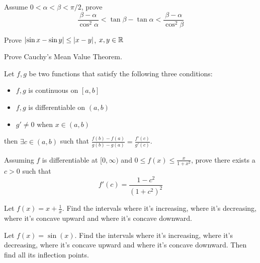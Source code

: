 \documentclass[Calculus 1 Recitation.tex]{subfiles}
\begin{document}
\begin{myleftlinebox}
	Assume $0<\alpha<\beta<\pi/2$, prove 
	\[\frac{\beta-\alpha}{\cos^2\alpha}<\tan\beta-\tan\alpha<\frac{\beta-\alpha}{\cos^2\beta}\]
	\tcblower
	\vspace{3em}	
\end{myleftlinebox}

\begin{myleftlinebox}
	Prove $\left\vert\sin x-\sin y\right\vert \leq \left\vert x-y\right\vert$, $x,y\in\mathbb{R}$
	\tcblower
	\vspace{3em}	
\end{myleftlinebox}

\begin{myleftlinebox}
	Prove Cauchy's Mean Value Theorem. 
	\begin{theorem}
		Let $f,g$ be two functions that satisfy the following three conditions:
		\begin{itemize}
			\item $f,g$ is continuous on $[a,b]$
			\item $f,g$ is differentiable on $(a,b)$
			\item $g'\neq0$ when $x\in(a,b)$
		\end{itemize}
		then $\exists c\in(a,b)$ such that $\frac{f(b)-f(a)}{g(b)-g(a)}=\frac{f'(c)}{g'(c)}$.
	\end{theorem}
	\tcblower
	\vspace{3em}	
\end{myleftlinebox}

\begin{myleftlinebox}
	Assuming $f$ is differentiable at $[0,\infty)$ and $0\leq f(x)\leq \frac{x}{1+x^2}$, prove there exists a $c>0$ such that
	\[f'(c)=\frac{1-c^2}{(1+c^2)^2}\]
	\tcblower
	\vspace{3em}
\end{myleftlinebox}

\begin{myleftlinebox}
	Let $f(x)=x+\frac{1}{x}$. Find the intervals where it's increasing, where it's decreasing, where it's concave upward and where it's concave downward.
	\tcblower
	\vspace{2em}
\end{myleftlinebox}

\begin{myleftlinebox}
	Let $f(x)=\sin(x)$. Find the intervals where it's increasing, where it's decreasing, where it's concave upward and where it's concave downward. Then find all its inflection points.
	\tcblower
	\vspace{2em}
\end{myleftlinebox}
\end{document}
